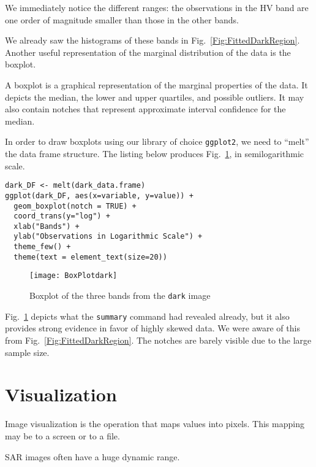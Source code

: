 We immediately notice the different ranges: the observations in the HV band are one order of magnitude smaller than those in the other bands.

We already saw the histograms of these bands in Fig.~\ref{Fig:FittedDarkRegion}.
Another useful representation of the marginal distribution of the data is the boxplot.

A boxplot is a graphical representation of the marginal properties of the data.
It depicts the median, the lower and upper quartiles, and possible outliers.
It may also contain notches that represent approximate interval confidence for the median.

In order to draw boxplots using our library of choice \texttt{ggplot2}, we need to ``melt'' the data frame structure.
The listing below produces Fig.~\ref{Fig:BoxplotDark}, in semilogarithmic scale.

\begin{lstlisting}[frame=tb]
dark_DF <- melt(dark_data.frame)
ggplot(dark_DF, aes(x=variable, y=value)) + 
  geom_boxplot(notch = TRUE) + 
  coord_trans(y="log") + 
  xlab("Bands") +
  ylab("Observations in Logarithmic Scale") + 
  theme_few() +
  theme(text = element_text(size=20))
\end{lstlisting}

\begin{figure}
\centering
\texttt{[image: BoxPlotdark]}
\caption{Boxplot of the three bands from the \texttt{dark} image}\label{Fig:BoxplotDark}
\end{figure}

Fig.~\ref{Fig:BoxplotDark} depicts what the \texttt{summary} command had revealed already, but it also provides strong evidence in favor of highly skewed data.
We were aware of this from Fig.~\ref{Fig:FittedDarkRegion}.
The notches are barely visible due to the large sample size.

\section{Visualization}

Image visualization is the operation that maps values into pixels\cite{IPVG:2008}.
This mapping may be to a screen or to a file.

SAR images often have a huge dynamic range.